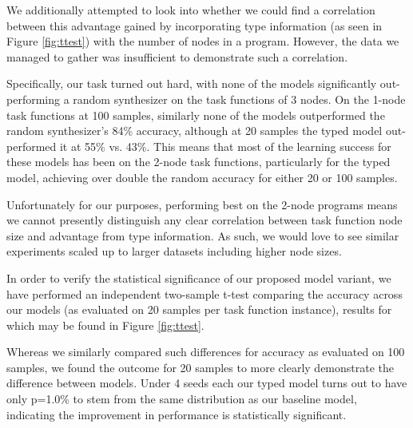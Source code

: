 \documentclass{article} %
\begin{document}
We additionally attempted to look into whether we could find a correlation between this
advantage gained by incorporating type information (as seen in Figure \ref{fig:ttest}) with the number of nodes in a program.
However, the data we managed to gather was insufficient to demonstrate such a correlation.


Specifically, our task turned out hard,
with none of the models significantly out-performing a random synthesizer
on the task functions of 3 nodes.
On the 1-node task functions at 100 samples,
similarly none of the models outperformed the random synthesizer's 84\% accuracy,
although at 20 samples the typed model out-performed it at 55\% vs. 43\%.
This means that most of the learning success for these models has been on the 2-node task functions,
particularly for the typed model, achieving over double the random accuracy for either 20 or 100 samples.

Unfortunately for our purposes, performing best on the 2-node programs
means we cannot presently distinguish any clear correlation between
task function node size and advantage from type information.
As such, we would love to see similar experiments scaled up to larger datasets including higher node sizes.

In order to verify the statistical significance of our proposed model variant,
we have performed an independent two-sample t-test comparing the accuracy across our models
(as evaluated on 20 samples per task function instance),
results for which may be found in Figure \ref{fig:ttest}.

Whereas we similarly compared such differences for accuracy as evaluated on 100 samples,
we found the outcome for 20 samples to more clearly demonstrate the difference between models.
Under 4 seeds each our typed model turns out to have only p=1.0\%
to stem from the same distribution as our baseline model,
indicating the improvement in performance is statistically significant.
\end{document}
